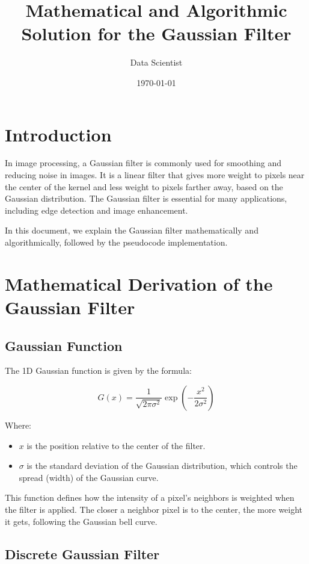 \documentclass{article}
\begin{document}
\title{Mathematical and Algorithmic Solution for the Gaussian Filter}
\author{Data Scientist}
\date{\today}


\maketitle

\section{Introduction}

In image processing, a Gaussian filter is commonly used for smoothing and reducing noise in images. It is a linear filter that gives more weight to pixels near the center of the kernel and less weight to pixels farther away, based on the Gaussian distribution. The Gaussian filter is essential for many applications, including edge detection and image enhancement.

In this document, we explain the Gaussian filter mathematically and algorithmically, followed by the pseudocode implementation.

\section{Mathematical Derivation of the Gaussian Filter}

\subsection{Gaussian Function}

The 1D Gaussian function is given by the formula:

\[
G(x) = \frac{1}{\sqrt{2\pi\sigma^2}} \exp\left(-\frac{x^2}{2\sigma^2}\right)
\]

Where:
\begin{itemize}
    \item $x$ is the position relative to the center of the filter.
    \item $\sigma$ is the standard deviation of the Gaussian distribution, which controls the spread (width) of the Gaussian curve.
\end{itemize}

This function defines how the intensity of a pixel's neighbors is weighted when the filter is applied. The closer a neighbor pixel is to the center, the more weight it gets, following the Gaussian bell curve.

\subsection{Discrete Gaussian Filter}
\end{document}
